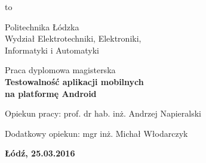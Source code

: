 \begin{titlepage}
    \vbox to \textheight
    {
        \begin{center}
            \begin{center}
                \LARGE
                Politechnika Łódzka \\
                Wydział Elektrotechniki, Elektroniki, \\
				Informatyki i Automatyki

            \end{center}

        \vspace*{3.75\baselineskip}
        \par\vspace{\smallskipamount}

        \vspace*{2\baselineskip}
        {\large
        Praca dyplomowa magisterska\\
        \huge\bfseries 
        Testowalność aplikacji mobilnych\\ na platformę Android\par}

        \vspace{2\baselineskip}{Rafał Sowiak\\Nr albumu: 199564\par}

        \vspace*{7\baselineskip}
        {Opiekun pracy: prof. dr hab. inż. Andrzej Napieralski\par}
        {Dodatkowy opiekun: mgr inż. Michał Włodarczyk\par}

        \vspace*{2\baselineskip}

        \begin{center}
            \textbf{Łódź, 25.03.2016}
        \end{center}

        \end{center}
    }
\end{titlepage}
